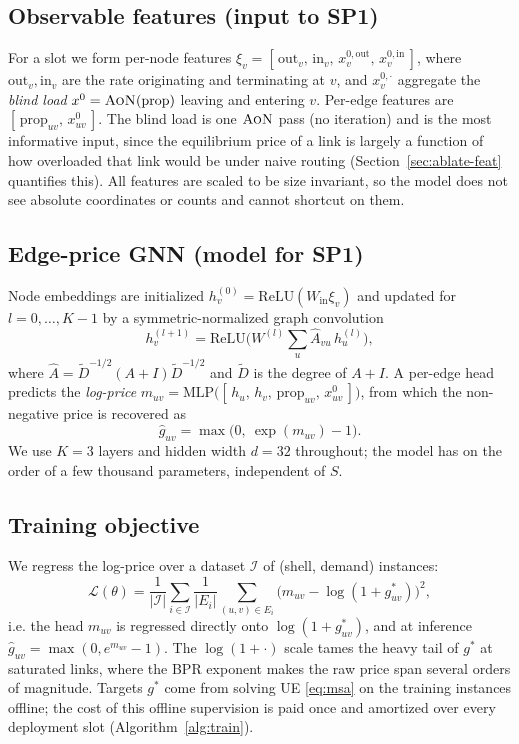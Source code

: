 \documentclass[journal]{IEEEtran}
\newcommand{\prop}{\mathrm{prop}}
\newcommand{\AoN}{\textsc{AoN}}
\begin{document}
\subsection{Observable features (input to SP1)}
For a slot we form per-node features
$\xi_v=[\,\mathrm{out}_v,\,\mathrm{in}_v,\,x^{0,\mathrm{out}}_v,\,x^{0,\mathrm{in}}_v\,]$,
where $\mathrm{out}_v,\mathrm{in}_v$ are the rate originating and terminating at $v$, and
$x^{0,\cdot}_v$ aggregate the \emph{blind load} $x^{0}=\AoN(\prop)$ leaving and entering
$v$. Per-edge features are $[\,\prop_{uv},\,x^{0}_{uv}\,]$. The blind load is one $\AoN$
pass (no iteration) and is the most informative input, since the equilibrium price of a
link is largely a function of how overloaded that link would be under naive routing
(Section~\ref{sec:ablate-feat} quantifies this). All features are scaled to be size
invariant, so the model does not see absolute coordinates or counts and cannot shortcut
on them.

\subsection{Edge-price GNN (model for SP1)}
Node embeddings are initialized $h_v^{(0)}=\mathrm{ReLU}(W_{\mathrm{in}}\xi_v)$ and
updated for $l=0,\dots,K-1$ by a symmetric-normalized graph convolution
\begin{equation}
h_v^{(l+1)}=\mathrm{ReLU}\!\Big(W^{(l)}\!\!\sum_{u}\hat A_{vu}\,h_u^{(l)}\Big),
\label{eq:gcn}
\end{equation}
where $\hat A=\tilde D^{-1/2}(A{+}I)\tilde D^{-1/2}$ and $\tilde D$ is the degree of
$A{+}I$. A per-edge head predicts the \emph{log-price}
$m_{uv}=\mathrm{MLP}\big([\,h_u,\,h_v,\,\prop_{uv},\,x^{0}_{uv}\,]\big)$, from which the
non-negative price is recovered as
\begin{equation}
\hat g_{uv}=\max\!\big(0,\ \exp(m_{uv})-1\big).
\label{eq:readout}
\end{equation}
We use $K=3$ layers and hidden width $d=32$ throughout; the model has on the order of a
few thousand parameters, independent of $S$.

\subsection{Training objective}
We regress the log-price over a dataset $\mathcal{I}$ of (shell, demand) instances:
\begin{equation}
\mathcal{L}(\theta)=\frac{1}{|\mathcal{I}|}\sum_{i\in\mathcal{I}}\frac{1}{|E_i|}
\sum_{(u,v)\in E_i}\!\Big(m_{uv}-\log(1{+}g^{*}_{uv})\Big)^2 ,
\label{eq:loss}
\end{equation}
i.e. the head $m_{uv}$ is regressed directly onto $\log(1{+}g^{*}_{uv})$, and at inference
$\hat g_{uv}=\max(0,e^{m_{uv}}-1)$.
The $\log(1{+}\cdot)$ scale tames the heavy tail of $g^{*}$ at saturated links, where the
BPR exponent makes the raw price span several orders of magnitude. Targets $g^{*}$ come
from solving UE \eqref{eq:msa} on the training instances offline; the cost of this
offline supervision is paid once and amortized over every deployment slot
(Algorithm~\ref{alg:train}).
\end{document}
